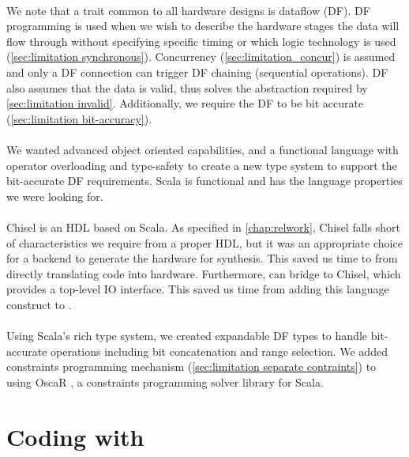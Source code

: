\paragraph{}We note that a trait common to all hardware designs is dataflow (DF). DF programming is used when we wish to describe the hardware stages the data will flow through without specifying specific timing or which logic technology is used (\autoref{sec:limitation synchronous}). Concurrency (\autoref{sec:limitation_concur}) is assumed and only a DF connection can trigger DF chaining (sequential operations). DF also assumes that the data is valid, thus solves the abstraction required by \autoref{sec:limitation invalid}. Additionally, we require the DF to be bit accurate (\autoref{sec:limitation bit-accuracy}).
\paragraph{}We wanted advanced object oriented capabilities, and a functional language with operator overloading and type-safety to create a new type system to support the bit-accurate DF requirements. Scala is functional and has the language properties we were looking for.  

\paragraph{}Chisel is an HDL based on Scala. As specified in \autoref{chap:relwork}, Chisel falls short of characteristics we require from a proper HDL, but it was an appropriate choice for a backend to generate the hardware for synthesis. This saved us time to from directly translating \cf code into hardware. Furthermore, \cf can bridge to Chisel, which provides a top-level IO interface. This saved us time from adding this language construct to \cfns. 

\paragraph{}Using Scala's rich type system, we created expandable DF types to handle bit-accurate operations including bit concatenation and range selection. We added constraints programming mechanism (\autoref{sec:limitation separate contraints}) to \cf using OscaR \cite{team3258oscar}, a constraints programming solver library for Scala.


\newpage
\section{Coding with \cf}
\label{sec:Coding with CAFEO}
